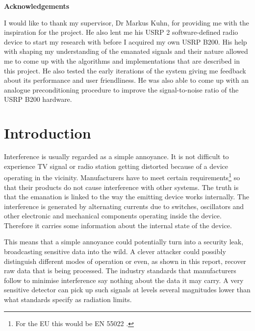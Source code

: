 \documentclass[a4paper,12pt,twoside,openright]{report}
\begin{document}
\pagestyle{empty}
\singlespacing

\onehalfspacing

\singlespacing


\newpage
{\Huge \bf Acknowledgements}
\vspace{24pt} 


I would like to thank my supervisor, Dr Markus Kuhn, for providing me with the inspiration for the project. He also lent me his USRP 2 software-defined radio device to start my research with before I acquired my own USRP B200. His help with shaping my understanding of the emanated signals and their nature allowed me to come up with the algorithms and implementations that are described in this project. He also tested the early iterations of the system giving me feedback about its performance and user friendliness. He was also able to come up with an analogue preconditioning procedure to improve the signal-to-noise ratio of the USRP B200 hardware.


\newpage
\vspace*{\fill}

\setcounter{page}{0}
\pagestyle{plain}
\tableofcontents

\onehalfspacing


\chapter{Introduction}
\setcounter{page}{1} 

Interference is usually regarded as a simple annoyance. It is not difficult to experience TV signal or radio station getting distorted because of a device operating in the vicinity. Manufacturers have to meet certain requirements\footnote{For the EU this would be EN 55022 \cite{en55022}.} so that their products do not cause interference with other systems. The truth is that the emanation is linked to the way the emitting device works internally. The interference is generated by alternating currents due to switches, oscillators and other electronic and mechanical components operating inside the device. Therefore it carries some information about the internal state of the device.

This means that a simple annoyance could potentially turn into a security leak, broadcasting sensitive data into the wild. A clever attacker could possibly distinguish different modes of operation or even, as shown in this report, recover raw data that is being processed. The industry standards that manufacturers follow to minimise interference say nothing about the data it may carry. A very sensitive detector can pick up such signals at levels several magnitudes lower than what standards specify as radiation limits.
\end{document}

